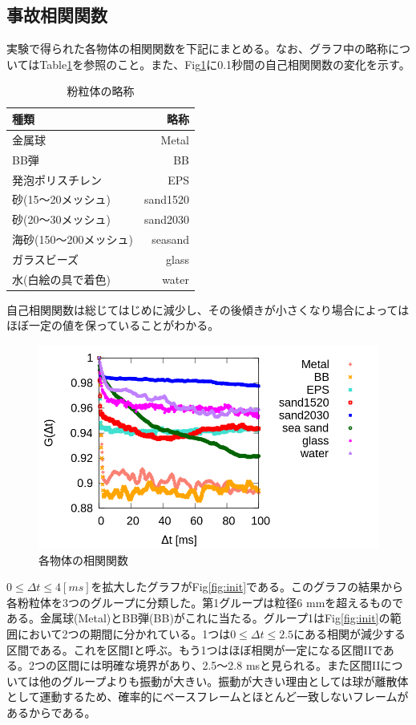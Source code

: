 \documentclass[a4j,12pt,dvipdfmx]{jsarticle}
\newcommand{\Dt}{\Delta t}
\newcommand{\II}{I\hspace{-.1em}I}
\begin{document}
\subsection{事故相関関数}
実験で得られた各物体の相関関数を下記にまとめる。なお、グラフ中の略称についてはTable\ref{tb:ballname}を参照のこと。また、Fig\ref{fig:overall}に0.1秒間の自己相関関数の変化を示す。 \par
\begin{table}[H]
	\caption{粉粒体の略称 \label{tb:ballname}}
	\begin{tabular}{lr}
		\toprule
		種類 & 略称 \\
		\midrule
		金属球 & Metal \\
		BB弾 & BB \\
		発泡ポリスチレン & EPS \\
		砂(15〜20メッシュ) & sand1520 \\
		砂(20〜30メッシュ) & sand2030 \\
		海砂(150〜200メッシュ) & seasand \\
		ガラスビーズ & glass \\
		水(白絵の具で着色) & water \\
		\bottomrule
	\end{tabular}
\end{table}
自己相関関数は総じてはじめに減少し、その後傾きが小さくなり場合によってはほぼ一定の値を保っていることがわかる。 \par
\begin{figure}[H]
	\includegraphics[scale=0.4]{multi.png}
	\caption{各物体の相関関数}
	\label{fig:overall}
\end{figure}
$0 \leq \Delta t \leq 4 [ms]$を拡大したグラフがFig\ref{fig:init}である。このグラフの結果から各粉粒体を3つのグループに分類した。第1グループは粒径6 mmを超えるものである。金属球(Metal)とBB弾(BB)がこれに当たる。グループ1はFig\ref{fig:init}の範囲において2つの期間に分かれている。1つは$0 \leq \Dt \leq 2.5$にある相関が減少する区間である。これを区間Iと呼ぶ。もう1つはほぼ相関が一定になる区間\II である。2つの区間には明確な境界があり、2.5〜2.8 msと見られる。また区間\II については他のグループよりも振動が大きい。振動が大きい理由としては球が離散体として運動するため、確率的にベースフレームとほとんど一致しないフレームがあるからである。 \par
\end{document}
